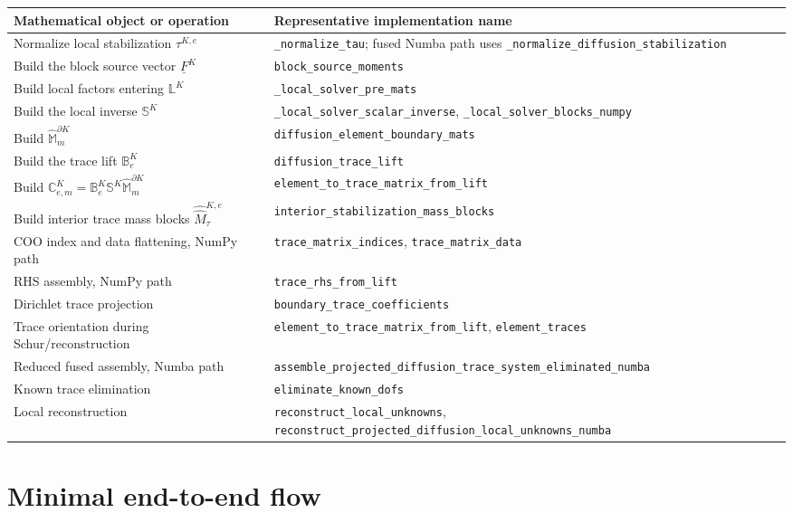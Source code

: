\documentclass[11pt]{article}
\newcommand{\FK}{\underline F^K}
\newcommand{\LK}{\mathbb L^K}
\newcommand{\SK}{\mathbb S^K}
\newcommand{\B}{\mathbb B}
\newcommand{\C}{\mathbb C}
\newcommand{\Mbb}{\widehat{\mathbb M}}
\newcommand{\Mhh}{\widehat{\widehat M}}
\newcommand{\code}[1]{\texttt{#1}}
\begin{document}
\begin{center}
\renewcommand{\arraystretch}{1.2}
\begin{tabular}{>{\raggedright\arraybackslash}p{} >{\raggedright\arraybackslash}p{}}
\toprule
Mathematical object or operation & Representative implementation name \\
\midrule
Normalize local stabilization $\tau^{K,e}$ & \code{\_normalize\_tau}; fused Numba path uses \code{\_normalize\_diffusion\_stabilization} \\
Build the block source vector $\FK$ & \code{block\_source\_moments} \\
Build local factors entering $\LK$ & \code{\_local\_solver\_pre\_mats} \\
Build the local inverse $\SK$ & \code{\_local\_solver\_scalar\_inverse}, \code{\_local\_solver\_blocks\_numpy} \\
Build $\Mbb_m^{\partial K}$ & \code{diffusion\_element\_boundary\_mats} \\
Build the trace lift $\B_e^K$ & \code{diffusion\_trace\_lift} \\
Build $\C_{e,m}^K=\B_e^K\SK\Mbb_m^{\partial K}$ & \code{element\_to\_trace\_matrix\_from\_lift} \\
Build interior trace mass blocks $\Mhh_\tau^{K,e}$ & \code{interior\_stabilization\_mass\_blocks} \\
COO index and data flattening, NumPy path & \code{trace\_matrix\_indices}, \code{trace\_matrix\_data} \\
RHS assembly, NumPy path & \code{trace\_rhs\_from\_lift} \\
Dirichlet trace projection & \code{boundary\_trace\_coefficients} \\
Trace orientation during Schur/reconstruction & \code{element\_to\_trace\_matrix\_from\_lift}, \code{element\_traces} \\
Reduced fused assembly, Numba path & \code{assemble\_projected\_diffusion\_trace\_system\_eliminated\_numba} \\
Known trace elimination & \code{eliminate\_known\_dofs} \\
Local reconstruction & \code{reconstruct\_local\_unknowns}, \code{reconstruct\_projected\_diffusion\_local\_unknowns\_numba} \\
\bottomrule
\end{tabular}
\end{center}

\section{Minimal end-to-end flow}
\end{document}
